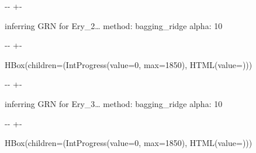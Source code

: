 \documentclass[letterpaper,10pt,english]{sphinxmanual}
\newlength\nbsphinxcodecellspacing
\begin{document}
%
{
\kern-\sphinxverbatimsmallskipamount\kern-\baselineskip
\kern+\FrameHeightAdjust\kern-\fboxrule
\vspace{\nbsphinxcodecellspacing}
%
\begin{sphinxVerbatim}[commandchars=\\\{\}]

inferring GRN for Ery\_2{\ldots}
method: bagging\_ridge
alpha: 10
\end{sphinxVerbatim}
}
\relax

{

\kern-\sphinxverbatimsmallskipamount\kern-\baselineskip
\kern+\FrameHeightAdjust\kern-\fboxrule
\vspace{\nbsphinxcodecellspacing}

%
\begin{sphinxVerbatim}[commandchars=\\\{\}]
HBox(children=(IntProgress(value=0, max=1850), HTML(value=\PYGZsq{}\PYGZsq{})))
\end{sphinxVerbatim}
}



%
{
\kern-\sphinxverbatimsmallskipamount\kern-\baselineskip
\kern+\FrameHeightAdjust\kern-\fboxrule
\vspace{\nbsphinxcodecellspacing}
%
\begin{sphinxVerbatim}[commandchars=\\\{\}]

inferring GRN for Ery\_3{\ldots}
method: bagging\_ridge
alpha: 10
\end{sphinxVerbatim}
}
\relax

{

\kern-\sphinxverbatimsmallskipamount\kern-\baselineskip
\kern+\FrameHeightAdjust\kern-\fboxrule
\vspace{\nbsphinxcodecellspacing}

%
\begin{sphinxVerbatim}[commandchars=\\\{\}]
HBox(children=(IntProgress(value=0, max=1850), HTML(value=\PYGZsq{}\PYGZsq{})))
\end{sphinxVerbatim}
}
\end{document}

